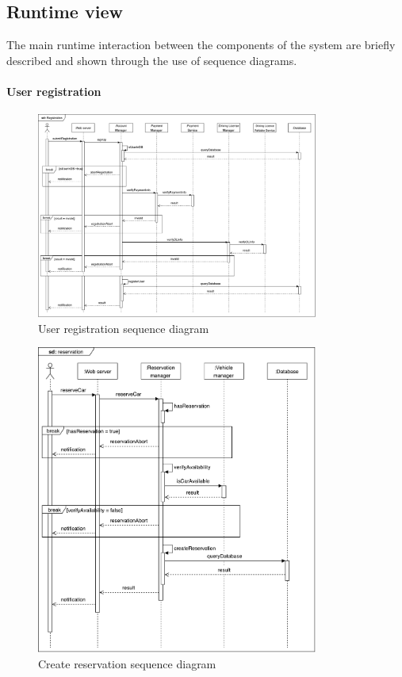 \subsection{Runtime view}

The main runtime interaction between the components of the system are briefly described and shown through the use of sequence diagrams.

\paragraph{User registration}

\begin{figure}[H]
	\includegraphics[width=350px]{../Datas/diagrams/registration.pdf}
	\caption{User registration sequence diagram}
	\label{fig:user-registration-seq-dig}
\end{figure}

\begin{figure}[H]
        \includegraphics[width=350px]{../Datas/diagrams/reservation.pdf}
        \caption{Create reservation sequence diagram}
        \label{fig:reservation-seq-dig}
\end{figure}

